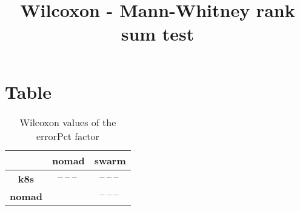 \documentclass{article}
\title{Wilcoxon - Mann-Whitney rank sum test}
\author{}
\begin{document}
\maketitle
\section{Table}
\begin{table}[!htp]
  \caption{Wilcoxon values of the errorPct factor}
  \label{table:errorPct}
  \centering
  \begin{scriptsize}
  \begin{tabular}{c|cc}
      & \textbf{nomad} & \textbf{swarm} \\\hline
      \textbf{k8s} & $\text{--}\ \text{--}\ \text{--}\  $ & $ \text{--}\ \text{--}\ \text{--}\ $ \\
      \textbf{nomad} & $ $ & $ \text{--}\ \text{--}\ \text{--}\ $ \\
  \end{tabular}
  \end{scriptsize}
\end{table}
\end{document}

